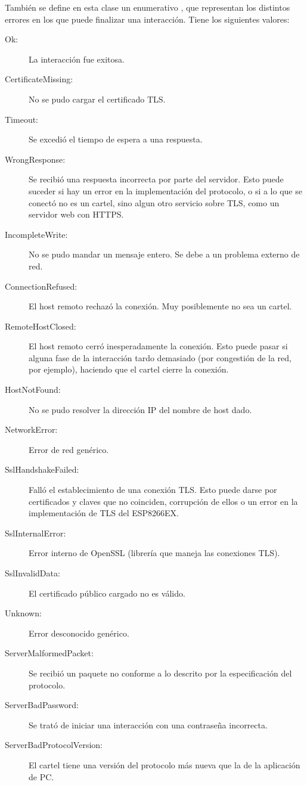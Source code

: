 También se define en esta clase un enumerativo , que representan los distintos errores en los que puede finalizar una interacción. Tiene los siguientes valores:
\begin{description}
	\item[Ok:] La interacción fue exitosa.
	\item[CertificateMissing:] No se pudo cargar el certificado TLS.
	\item[Timeout:] Se excedió el tiempo de espera a una respuesta.
	\item[WrongResponse:] Se recibió una respuesta incorrecta por parte del servidor. Esto puede suceder si hay un error en la implementación del protocolo, o si a lo que se conectó no es un cartel, sino algun otro servicio sobre TLS, como un servidor web con HTTPS.
	\item[IncompleteWrite:] No se pudo mandar un mensaje entero. Se debe a un problema externo de red.
	\item[ConnectionRefused:] El host remoto rechazó la conexión. Muy posiblemente no sea un cartel.
	\item[RemoteHostClosed:] El host remoto cerró inesperadamente la conexión. Esto puede pasar si alguna fase de la interacción tardo demasiado (por congestión de la red, por ejemplo), haciendo que el cartel cierre la conexión.
	\item[HostNotFound:] No se pudo resolver la dirección IP del nombre de host dado.
	\item[NetworkError:] Error de red genérico.
	\item[SslHandshakeFailed:] Falló el establecimiento de una conexión TLS. Esto puede darse por certificados y claves que no coinciden, corrupción de ellos o un error en la implementación de TLS del ESP8266EX.
	\item[SslInternalError:] Error interno de OpenSSL (librería que maneja las conexiones TLS).
	\item[SslInvalidData:] El certificado público cargado no es válido.
	\item[Unknown:] Error desconocido genérico.
	\item[ServerMalformedPacket:] Se recibió un paquete no conforme a lo descrito por la especificación del protocolo.
	\item[ServerBadPassword:] Se trató de iniciar una interacción con una contraseña incorrecta.
	\item[ServerBadProtocolVersion:] El cartel tiene una versión del protocolo más nueva que la de la aplicación de PC.
\end{description}
